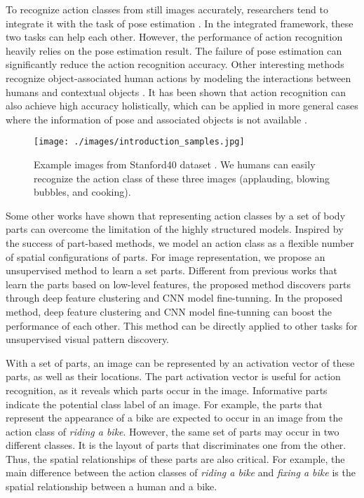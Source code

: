 \documentclass[journal]{IEEEtran}
\begin{document}
To recognize action classes from still images accurately, researchers tend to integrate it with the task of pose estimation \cite{YangWMCVPR10,Yao_modeling_mutual_2010_CVPR}.
In the integrated framework, these two tasks can help each other. 
However, the performance of action recognition heavily relies on the pose estimation result. The failure of pose estimation can significantly reduce the action recognition accuracy. Other interesting methods recognize object-associated human actions by modeling the interactions between humans and contextual objects \cite{Delaitre11learningperson-object,GroupletYaoBangpengFeifeiLI}.
It has been shown that action recognition can also achieve high accuracy holistically, which can be applied in more general cases where the information of pose and associated objects is not available \cite{sharma:CVPR2012_Discriminative,Delaitre10recognizinghuman,sharma:CVPR2013}. 

\begin{figure}[h]
	\begin{center}
		\texttt{[image: ./images/introduction\_samples.jpg]}
	\end{center}
	\caption{Example images from Stanford40 dataset \cite{Yao11humanaction__Stanford40}. We humans can easily recognize the action class of these three images (applauding, blowing bubbles, and cooking).}
	\label{fig:introductionExample}
\end{figure}

Some other works \cite{Yao11humanaction__Stanford40,MajiActionCVPR11,sharma:CVPR2013,BourdevMalikICCV09,Yao_modeling_mutual_2010_CVPR} have shown that representing action classes by a set of body parts can overcome the limitation of the highly structured models.
Inspired by the success of part-based methods, we model an action class as a flexible number of spatial configurations of parts.
For image representation, we propose an unsupervised method to learn a set parts. Different from previous works that learn the parts based on low-level features, the proposed method discovers parts through deep feature clustering and CNN model fine-tunning. 
In the proposed method, deep feature clustering and CNN model fine-tunning can boost the performance of each other. This method can be directly applied to other tasks for unsupervised visual pattern discovery.


With a set of parts, an image can be represented by an activation vector of these parts, as well as their locations. The part activation vector is useful for action recognition, as it reveals which parts occur in the image. Informative parts indicate the potential class label of an image. For example, the parts that represent the appearance of a bike are expected to occur in an image from the action class of \textit{riding a bike}.
However, the same set of parts may occur in two different classes. It is the layout of parts that discriminates one from the other.   
Thus, the spatial relationships of these parts are also critical.
For example, the main difference between the action classes of \textit{riding a bike} and \textit{fixing a bike} is the spatial relationship between a human and a bike.
\end{document}
